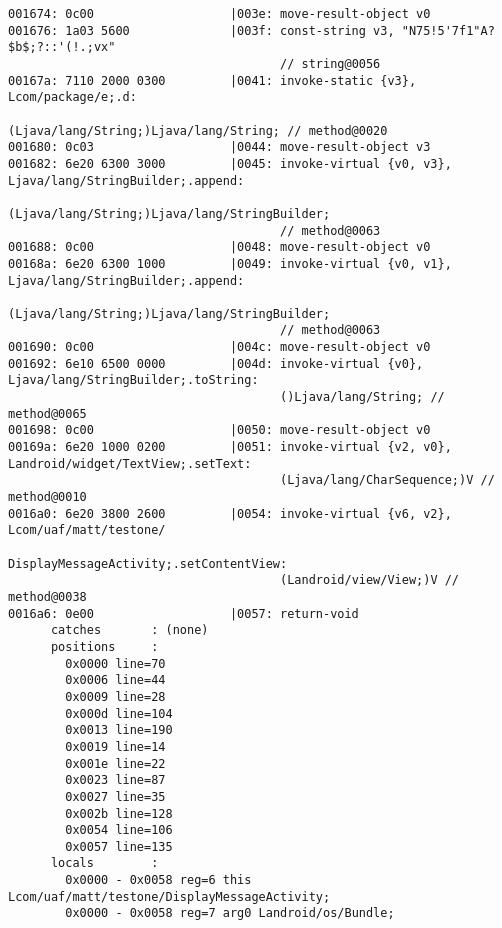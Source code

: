 \begin{lstlisting}
001674: 0c00                   |003e: move-result-object v0
001676: 1a03 5600              |003f: const-string v3, "N75!5'7f1"A?$b$;?::'(!.;vx"
                                      // string@0056
00167a: 7110 2000 0300         |0041: invoke-static {v3}, Lcom/package/e;.d:
                                     (Ljava/lang/String;)Ljava/lang/String; // method@0020
001680: 0c03                   |0044: move-result-object v3
001682: 6e20 6300 3000         |0045: invoke-virtual {v0, v3}, Ljava/lang/StringBuilder;.append:
                                      (Ljava/lang/String;)Ljava/lang/StringBuilder;
                                      // method@0063
001688: 0c00                   |0048: move-result-object v0
00168a: 6e20 6300 1000         |0049: invoke-virtual {v0, v1}, Ljava/lang/StringBuilder;.append:
                                      (Ljava/lang/String;)Ljava/lang/StringBuilder;
                                      // method@0063
001690: 0c00                   |004c: move-result-object v0
001692: 6e10 6500 0000         |004d: invoke-virtual {v0}, Ljava/lang/StringBuilder;.toString:
                                      ()Ljava/lang/String; // method@0065
001698: 0c00                   |0050: move-result-object v0
00169a: 6e20 1000 0200         |0051: invoke-virtual {v2, v0}, Landroid/widget/TextView;.setText:
                                      (Ljava/lang/CharSequence;)V // method@0010
0016a0: 6e20 3800 2600         |0054: invoke-virtual {v6, v2}, Lcom/uaf/matt/testone/
                                      DisplayMessageActivity;.setContentView:
                                      (Landroid/view/View;)V // method@0038
0016a6: 0e00                   |0057: return-void
      catches       : (none)
      positions     :
        0x0000 line=70
        0x0006 line=44
        0x0009 line=28
        0x000d line=104
        0x0013 line=190
        0x0019 line=14
        0x001e line=22
        0x0023 line=87
        0x0027 line=35
        0x002b line=128
        0x0054 line=106
        0x0057 line=135
      locals        :
        0x0000 - 0x0058 reg=6 this Lcom/uaf/matt/testone/DisplayMessageActivity;
        0x0000 - 0x0058 reg=7 arg0 Landroid/os/Bundle;


\end{lstlisting}
